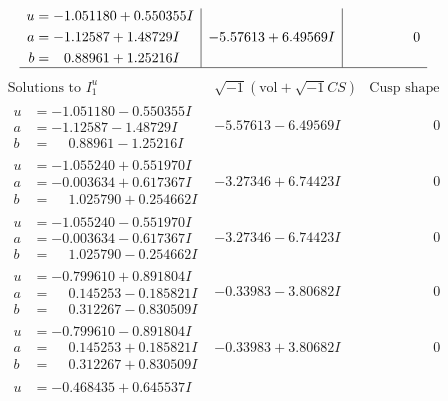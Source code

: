 \documentclass[1p]{elsarticle_modified}
\theoremstyle{definition}
\newcommand{\I}{\sqrt{-1}}
\begin{document}
$$\begin{array}{c|c|c}
\begin{aligned}
u &= -1.051180 + 0.550355 I \\
a &= -1.12587 + 1.48729 I \\
b &= \phantom{-}0.88961 + 1.25216 I\end{aligned}
 & -5.57613 + 6.49569 I & \phantom{-0.000000 } 0\\
 \hline 
 \end{array}$$\newpage$$\begin{array}{c|c|c}  
\text{Solutions to }I^u_{1}& \I (\text{vol} + \sqrt{-1}CS) & \text{Cusp shape}\\
 \hline 
\begin{aligned}
u &= -1.051180 - 0.550355 I \\
a &= -1.12587 - 1.48729 I \\
b &= \phantom{-}0.88961 - 1.25216 I\end{aligned}
 & -5.57613 - 6.49569 I & \phantom{-0.000000 } 0 \\ \hline\begin{aligned}
u &= -1.055240 + 0.551970 I \\
a &= -0.003634 + 0.617367 I \\
b &= \phantom{-}1.025790 + 0.254662 I\end{aligned}
 & -3.27346 + 6.74423 I & \phantom{-0.000000 } 0 \\ \hline\begin{aligned}
u &= -1.055240 - 0.551970 I \\
a &= -0.003634 - 0.617367 I \\
b &= \phantom{-}1.025790 - 0.254662 I\end{aligned}
 & -3.27346 - 6.74423 I & \phantom{-0.000000 } 0 \\ \hline\begin{aligned}
u &= -0.799610 + 0.891804 I \\
a &= \phantom{-}0.145253 - 0.185821 I \\
b &= \phantom{-}0.312267 - 0.830509 I\end{aligned}
 & -0.33983 - 3.80682 I & \phantom{-0.000000 } 0 \\ \hline\begin{aligned}
u &= -0.799610 - 0.891804 I \\
a &= \phantom{-}0.145253 + 0.185821 I \\
b &= \phantom{-}0.312267 + 0.830509 I\end{aligned}
 & -0.33983 + 3.80682 I & \phantom{-0.000000 } 0 \\ \hline\begin{aligned}
u &= -0.468435 + 0.645537 I \\

\end{aligned}
\end{array}$$
\end{document}
